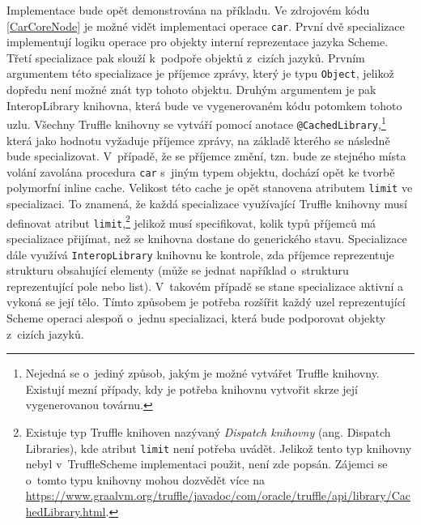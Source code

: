 \documentclass[
  master,
  biblatex,
  figures=true,
  theorems,
  sourcecodes,
  glossaries,
  index
]{kidiplom}
\begin{document}
 Implementace bude opět demonstrována na příkladu. Ve zdrojovém kódu \ref{CarCoreNode} je možné vidět implementaci operace \texttt{car}. První dvě specializace implementují logiku operace pro objekty interní reprezentace jazyka Scheme. Třetí specializace pak slouží k~podpoře objektů z~cizích jazyků. Prvním argumentem této specializace je příjemce zprávy, který je typu \texttt{Object}, jelikož dopředu není možné znát typ tohoto objektu. Druhým argumentem je pak InteropLibrary knihovna, která bude ve vygenerovaném kódu potomkem tohoto uzlu. Všechny Truffle knihovny se vytváří pomocí anotace \texttt{@CachedLibrary},\footnote{Nejedná se o~jediný způsob, jakým je možné vytvářet Truffle knihovny. Existují mezní případy, kdy je potřeba knihovnu vytvořit skrze její vygenerovanou továrnu.} která jako hodnotu vyžaduje příjemce zprávy, na základě kterého se následně bude specializovat. V~případě, že se příjemce změní, tzn. bude ze stejného místa volání zavolána procedura \texttt{car} s~jiným typem objektu, dochází opět ke tvorbě polymorfní inline cache. Velikost této cache je opět stanovena atributem \texttt{limit} ve specializaci. To znamená, že každá specializace využívající Truffle knihovny musí definovat atribut \texttt{limit},\footnote{Existuje typ Truffle knihoven nazývaný \textit{Dispatch knihovny} (ang. Dispatch Libraries), kde atribut \texttt{limit} není potřeba uvádět. Jelikož tento typ knihovny nebyl v~TruffleScheme implementaci použit, není zde popsán. Zájemci se o~tomto typu knihovny mohou dozvědět více na \url{https://www.graalvm.org/truffle/javadoc/com/oracle/truffle/api/library/CachedLibrary.html}.} jelikož musí specifikovat, kolik typů příjemců má specializace přijímat, než se knihovna dostane do generického stavu. Specializace dále využívá \texttt{InteropLibrary} knihovnu ke kontrole, zda příjemce reprezentuje strukturu obsahující elementy (může se jednat například o~strukturu reprezentující pole nebo list). V~takovém případě se stane specializace aktivní a vykoná se její tělo. Tímto způsobem je potřeba rozšířit každý uzel reprezentující Scheme operaci alespoň o~jednu specializaci, která bude podporovat objekty z~cizích jazyků.
\end{document}
